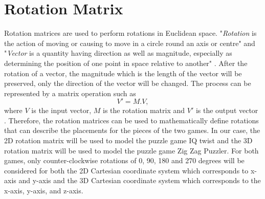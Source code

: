 \section{Rotation Matrix}
Rotation matrices are used to perform rotations in Euclidean space. "\emph{Rotation} is the action of moving or causing to move in a circle round an axis or centre" and "\emph{Vector} is a quantity having direction as well as magnitude, especially as determining the position of one point in space relative to another" \cite{r14}. After the rotation of a vector, the magnitude which is the length of the vector will be preserved, only the direction of the vector will be changed. The process can be represented by a matrix operation such as 
\begin{equation}
V'=M.V,
\end{equation}
where $V$ is the input vector, $M$ is the rotation matrix and $V'$ is the output vector \cite{r15}. Therefore, the rotation matrices can be used to mathematically define rotations that can describe the placements for the pieces of the two games. In our case, the 2D rotation matrix will be used to model the puzzle game IQ twist and the 3D rotation matrix will be used to model the puzzle game Zig Zag Puzzler. For both games, only counter-clockwise rotations of 0, 90, 180 and 270 degrees will be considered for both the 2D Cartesian coordinate system which corresponds to x-axis and y-axis and the 3D Cartesian coordinate system which corresponds to the x-axis, y-axis, and z-axis.

